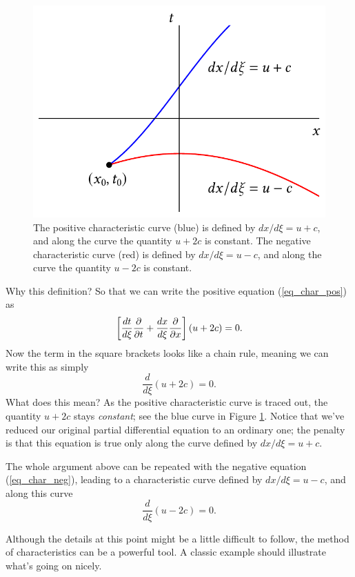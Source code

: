 \begin{figure}
\centering
\includegraphics[width=0.7\linewidth]{Figures/Chapter6/fig_nonlinear_curves}
\caption{The positive characteristic curve (blue) is defined by $dx/d\xi = u+c$, and along the curve the quantity $u+2c$ is constant.  The negative characteristic curve (red) is defined by $dx/d\xi = u-c$, and along the curve the quantity $u - 2c$ is constant. }
\label{fig_nonlinear_curves}
\end{figure}

Why this definition?  So that we can write the positive equation (\ref{eq_char_pos}) as
\[
\left[ \frac{dt}{d\xi} \frac{\partial {}}{\partial {t}} + \frac{dx}{d\xi} \frac{\partial {}}{\partial {x}} \right] (u + 2c) = 0.
\]
Now the term in the square brackets looks like a chain rule, meaning we can write this as simply
\begin{equation}
\boxed{
\frac{d}{d\xi} (u + 2c) = 0.
}
\end{equation}
What does this mean?  As the positive characteristic curve is traced out, the quantity $u+2c$ stays \emph{constant}; see the blue curve in Figure \ref{fig_nonlinear_curves}.  Notice that we've reduced our original partial differential equation to an ordinary one; the penalty is that this equation is true only along the curve defined by $dx/d\xi = u+c$.

The whole argument above can be repeated with the negative equation (\ref{eq_char_neg}), leading to a characteristic curve defined by $dx/d\xi = u-c$, and along this curve
\begin{equation}
\boxed{
\frac{d}{d\xi} (u - 2c) = 0.
}
\end{equation}

Although the details at this point might be a little difficult to follow, the method of characteristics can be a powerful tool.  A classic example should illustrate what's going on nicely.

